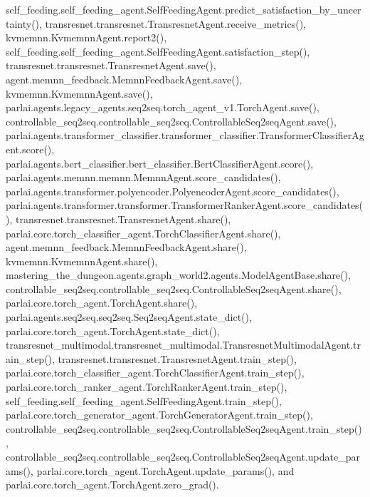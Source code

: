 self\+\_\+feeding.\+self\+\_\+feeding\+\_\+agent.\+Self\+Feeding\+Agent.\+predict\+\_\+satisfaction\+\_\+by\+\_\+uncertainty(), transresnet.\+transresnet.\+Transresnet\+Agent.\+receive\+\_\+metrics(), kvmemnn.\+Kvmemnn\+Agent.\+report2(), self\+\_\+feeding.\+self\+\_\+feeding\+\_\+agent.\+Self\+Feeding\+Agent.\+satisfaction\+\_\+step(), transresnet.\+transresnet.\+Transresnet\+Agent.\+save(), agent.\+memnn\+\_\+feedback.\+Memnn\+Feedback\+Agent.\+save(), kvmemnn.\+Kvmemnn\+Agent.\+save(), parlai.\+agents.\+legacy\+\_\+agents.\+seq2seq.\+torch\+\_\+agent\+\_\+v1.\+Torch\+Agent.\+save(), controllable\+\_\+seq2seq.\+controllable\+\_\+seq2seq.\+Controllable\+Seq2seq\+Agent.\+save(), parlai.\+agents.\+transformer\+\_\+classifier.\+transformer\+\_\+classifier.\+Transformer\+Classifier\+Agent.\+score(), parlai.\+agents.\+bert\+\_\+classifier.\+bert\+\_\+classifier.\+Bert\+Classifier\+Agent.\+score(), parlai.\+agents.\+memnn.\+memnn.\+Memnn\+Agent.\+score\+\_\+candidates(), parlai.\+agents.\+transformer.\+polyencoder.\+Polyencoder\+Agent.\+score\+\_\+candidates(), parlai.\+agents.\+transformer.\+transformer.\+Transformer\+Ranker\+Agent.\+score\+\_\+candidates(), transresnet.\+transresnet.\+Transresnet\+Agent.\+share(), parlai.\+core.\+torch\+\_\+classifier\+\_\+agent.\+Torch\+Classifier\+Agent.\+share(), agent.\+memnn\+\_\+feedback.\+Memnn\+Feedback\+Agent.\+share(), kvmemnn.\+Kvmemnn\+Agent.\+share(), mastering\+\_\+the\+\_\+dungeon.\+agents.\+graph\+\_\+world2.\+agents.\+Model\+Agent\+Base.\+share(), controllable\+\_\+seq2seq.\+controllable\+\_\+seq2seq.\+Controllable\+Seq2seq\+Agent.\+share(), parlai.\+core.\+torch\+\_\+agent.\+Torch\+Agent.\+share(), parlai.\+agents.\+seq2seq.\+seq2seq.\+Seq2seq\+Agent.\+state\+\_\+dict(), parlai.\+core.\+torch\+\_\+agent.\+Torch\+Agent.\+state\+\_\+dict(), transresnet\+\_\+multimodal.\+transresnet\+\_\+multimodal.\+Transresnet\+Multimodal\+Agent.\+train\+\_\+step(), transresnet.\+transresnet.\+Transresnet\+Agent.\+train\+\_\+step(), parlai.\+core.\+torch\+\_\+classifier\+\_\+agent.\+Torch\+Classifier\+Agent.\+train\+\_\+step(), parlai.\+core.\+torch\+\_\+ranker\+\_\+agent.\+Torch\+Ranker\+Agent.\+train\+\_\+step(), self\+\_\+feeding.\+self\+\_\+feeding\+\_\+agent.\+Self\+Feeding\+Agent.\+train\+\_\+step(), parlai.\+core.\+torch\+\_\+generator\+\_\+agent.\+Torch\+Generator\+Agent.\+train\+\_\+step(), controllable\+\_\+seq2seq.\+controllable\+\_\+seq2seq.\+Controllable\+Seq2seq\+Agent.\+train\+\_\+step(), controllable\+\_\+seq2seq.\+controllable\+\_\+seq2seq.\+Controllable\+Seq2seq\+Agent.\+update\+\_\+params(), parlai.\+core.\+torch\+\_\+agent.\+Torch\+Agent.\+update\+\_\+params(), and parlai.\+core.\+torch\+\_\+agent.\+Torch\+Agent.\+zero\+\_\+grad().

